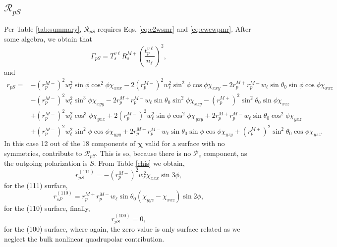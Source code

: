 

\subsection{\texorpdfstring{$\mathcal{R}_{pS}$}{RpS}}\label{sec:RpS}

Per Table \ref{tab:summary}, $\mathcal{R}_{pS}$ requires Eqs. \eqref{eq:e2wsmr}
and \eqref{eq:ewewpmr}. After some algebra, we obtain that
\begin{equation}\label{mcv}
\Gamma_{pS} =
T_{s}^{v\ell}R^{M+}_{s}
\left(\frac{t^{v\ell}_{p}}{n_{\ell}}\right)^{2},
\end{equation}
and
\begin{equation}
\begin{split}
r_{pS}=
&- \left(r^{M-}_{p}\right)^{2}w^{2}_{\ell}\sin\phi\cos^{2}\phi\chi_{xxx}
 - 2\left(r^{M-}_{p}\right)^{2}w^{2}_{\ell}\sin^{2}\phi\cos\phi\chi_{xxy}
 - 2r^{M+}_{p}r^{M-}_{p}w_{\ell}\sin\theta_{0}\sin\phi\cos\phi\chi_{xxz}\\
&- \left(r^{M-}_{p}\right)^{2}w^{2}_{\ell}\sin^{3}\phi\chi_{xyy}
 - 2r^{M+}_{p}r^{M-}_{p}w_{\ell}\sin\theta_{0}\sin^{2}\phi\chi_{xzy}
 - \left(r^{M+}_{p}\right)^{2}\sin^{2}\theta_{0}\sin\phi\chi_{xzz}\\
&+ \left(r^{M-}_{p}\right)^{2}w^{2}_{\ell}\cos^{3}\phi\chi_{yxx}
 + 2\left(r^{M-}_{p}\right)^{2}w^{2}_{\ell}\sin\phi\cos^{2}\phi\chi_{yxy}
 + 2r^{M+}_{p}r^{M-}_{p}w_{\ell}\sin\theta_{0}\cos^{2}\phi\chi_{yxz}\\
&+ \left(r^{M-}_{p}\right)^{2}w^{2}_{\ell}\sin^{2}\phi\cos\phi\chi_{yyy}
 + 2r^{M+}_{p}r^{M-}_{p}w_{\ell}\sin\theta_{0}\sin\phi\cos\phi\chi_{yzy}
 + \left(r^{M+}_{p}\right)^{2}\sin^{2}\theta_{0}\cos\phi\chi_{yzz}.
\end{split}
\end{equation}
In this case 12 out of the 18 components of $\boldsymbol{\chi}$ valid for a
surface with no symmetries, contribute to $\mathcal{R}_{pS}$. This is so,
because there is no $\mathcal{P}_{z}$ component, as the outgoing polarization is
$S$. From Table \ref{chis} we obtain,
\begin{equation}\label{r111ps}
r^{(111)}_{pS} = - \left(r^{M-}_{p}\right)^{2}w^{2}_{\ell}\chi_{xxx}\sin3\phi,
\end{equation}
for the (111) surface,
\begin{equation}\label{r110ps}
r^{(110)}_{sP} =
r^{M+}_{p}r^{M-}_{p}w_{\ell}\sin\theta_{0}(\chi_{yyz} - \chi_{xxz})\sin2\phi,
\end{equation}
for the (110) surface, 
finally,
\begin{equation}\label{r100ps}
r^{(100)}_{pS} = 0,
\end{equation}
for the (100) surface, where again, the zero value is only surface related as we
neglect  the bulk nonlinear quadrupolar contribution.

